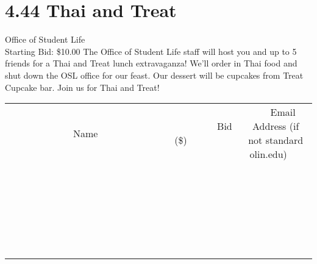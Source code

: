 \documentclass[11pt]{article}
\begin{document}
\section*{4.44 Thai and Treat}
Office of Student Life
\\
Starting Bid: \$10.00
\newline
The Office of Student Life staff will host you and up to 5 friends for a Thai and Treat lunch extravaganza!  We'll order in Thai food and shut down the OSL office for our feast.  Our dessert will be cupcakes from Treat Cupcake bar.  Join us for Thai and Treat!
\\[6ex]
\begin{tabular}{c c c}
~~~~~~~~~~~~~Name~~~~~~~~~~~~~ & ~~~~~~~~~Bid (\$)~~~~~~~~~  & ~~~Email Address (if not standard olin.edu)~~~\\
 & & \\
\hline
 & & \\
\hline
 & & \\
\hline
 & & \\
\hline
 & & \\
\hline
 & & \\
\hline
 & & \\
\hline
 & & \\
\hline
 & & \\
\hline
 & & \\
\hline
 & & \\
\hline
 & & \\
\hline
 & & \\
\hline
 & & \\
\hline
 & & \\
\hline
 & & \\
\hline
 & & \\
\hline
 & & \\
\hline
 & & \\
\hline
 & & \\
\hline
 & & \\
\hline
 & & \\
\hline
 & & \\
\hline
 & & \\
\hline
 & & \\
\hline
 & & \\
\hline
\end{tabular}
\newpage
\end{document}
